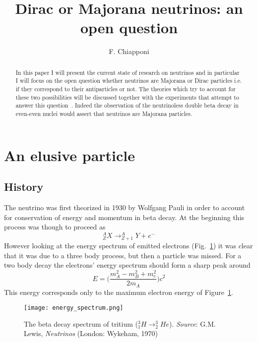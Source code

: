 \documentclass{subnucbo}
\begin{document}
\title{Dirac or Majorana neutrinos: an open question}

\author{F. Chiapponi} 



\maketitle

\begin{abstract}
In this paper I will present the current state of research on neutrinos and in particular I will focus on the open question whether neutrinos are Majorana or Dirac particles i.e. if they correspond to their antiparticles or not. The theories which try to account for these two possibilities will be discussed together with the experiments that attempt to answer this question~\cite{ref:front,ref:cupid}. Indeed the observation of the neutrinoless double beta decay in even-even nuclei would assert that neutrinos are Majorana particles. 
\end{abstract}

\section{An elusive particle}
\subsection{History}
The neutrino was first theorized in 1930 by Wolfgang Pauli in order to account for conservation of energy and momentum in beta decay.
At the beginning this process was though to proceed as
\[
^A_Z X\rightarrow ^A_{Z+1}Y+e^-
\]
However looking at the energy spectrum of emitted electrons (Fig.~\ref{fig:betaD}) it was clear that it was due to a three body process, but then a particle was missed. For a two body decay the electrons' energy spectrum should form a sharp peak around 
\begin{equation}
E=\biggl(\frac{m^2_A-m^2_B+m^2_e}{2m_A}\biggr)c^2
\label{eq:Emax}
\end{equation}
This energy corresponds only to the maximum electron energy of Figure~\ref{fig:betaD}.

\begin{figure}[h]
\centering
\texttt{[image: energy\_spectrum.png]}
\caption{The beta decay spectrum of tritium ($^3_1H\rightarrow ^3_2He$). \emph{Source}: G.M. Lewis, \emph{Neutrinos} (London: Wykeham, 1970)}
\label{fig:betaD}
\end{figure}
\end{document}
